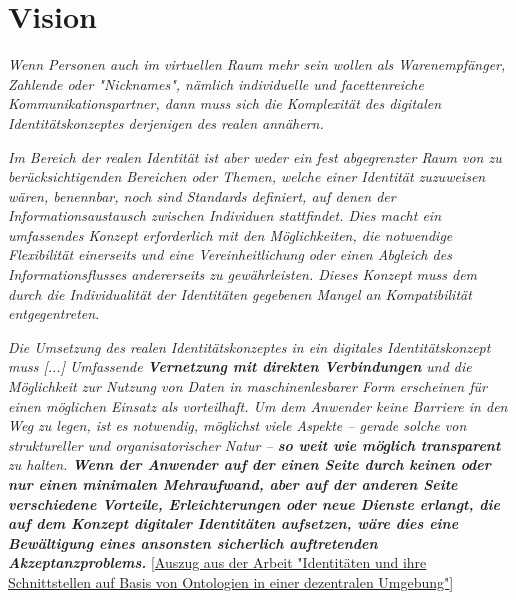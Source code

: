 \section{Vision}
\label{sec:vision}


\vspace{0.3cm}

\textit{Wenn Personen auch im virtuellen Raum mehr sein wollen als Warenempfänger,
Zahlende oder "Nicknames", nämlich individuelle und facettenreiche Kommunikationspartner, dann muss sich die Komplexität des digitalen Identitätskonzeptes derjenigen
des realen annähern.}

\textit{Im Bereich der realen Identität ist aber weder ein fest abgegrenzter Raum von zu berücksichtigenden Bereichen oder Themen, welche einer Identität zuzuweisen wären, benennbar, noch sind Standards definiert, auf denen der Informationsaustausch zwischen
Individuen stattfindet. Dies macht ein umfassendes Konzept erforderlich mit den Möglichkeiten, die notwendige Flexibilität einerseits und eine Vereinheitlichung oder einen Abgleich des Informationsflusses andererseits zu gewährleisten. Dieses Konzept muss
dem durch die Individualität der Identitäten gegebenen Mangel an Kompatibilität entgegentreten.} 

\textit{Die Umsetzung des realen Identitätskonzeptes in ein digitales Identitätskonzept muss [...] Umfassende \textbf{Vernetzung mit direkten Verbindungen} und
die Möglichkeit zur Nutzung von Daten in maschinenlesbarer Form erscheinen für einen möglichen Einsatz als vorteilhaft. Um dem Anwender keine Barriere in den Weg
zu legen, ist es notwendig, möglichst viele Aspekte – gerade solche von struktureller und
organisatorischer Natur – \textbf{so weit wie möglich transparent} zu halten. \textbf{Wenn der Anwender auf der einen Seite durch keinen oder nur einen minimalen Mehraufwand, aber auf der anderen Seite verschiedene Vorteile, Erleichterungen oder neue Dienste erlangt, die auf dem Konzept digitaler Identitäten aufsetzen, wäre dies eine Bewältigung eines ansonsten sicherlich auftretenden Akzeptanzproblems.}} [\href{https://vsis-www.informatik.uni-hamburg.de/getDoc.php/thesis/47/DA_Gordian_Kaulbarsch.pdf}{Auszug aus der Arbeit "Identitäten und ihre Schnittstellen auf Basis von Ontologien in einer dezentralen Umgebung"}]

\vspace{0.3cm}


